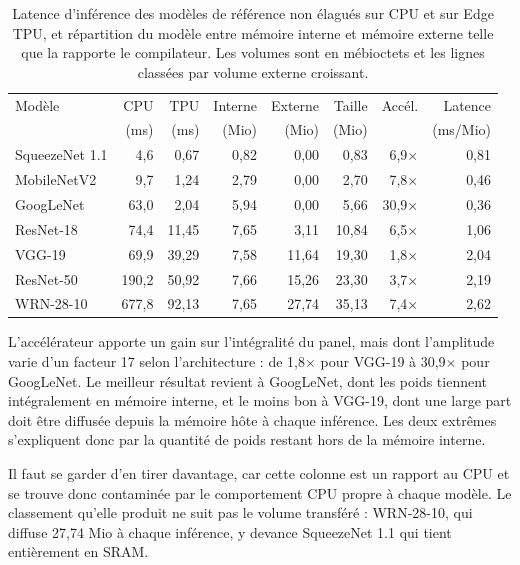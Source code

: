 \documentclass[11pt,a4paper]{report}
\begin{document}
\begin{table}[H]
\centering\footnotesize\setlength{\tabcolsep}{4pt}
\caption[Latence des modèles de référence sur CPU et Edge TPU]{Latence d'inférence des modèles de référence non élagués sur CPU et sur Edge TPU, et répartition du modèle entre mémoire interne et mémoire externe telle que la rapporte le compilateur. Les volumes sont en mébioctets et les lignes classées par volume externe croissant.}
\label{tab:baselines}
\begin{tabular}{lrrrrrrr}
\toprule
Modèle & CPU & TPU & Interne & Externe & Taille & Accél. & Latence \\
       & (ms) & (ms) & (Mio)  & (Mio)   & (Mio)  &        & (ms/Mio) \\
\midrule
SqueezeNet 1.1  &   4,6 &  0,67 & 0,82 &  0,00 &  0,83 &  6,9$\times$ & 0,81 \\
MobileNetV2     &   9,7 &  1,24 & 2,79 &  0,00 &  2,70 &  7,8$\times$ & 0,46 \\
GoogLeNet       &  63,0 &  2,04 & 5,94 &  0,00 &  5,66 & 30,9$\times$ & 0,36 \\
\midrule
ResNet-18       &  74,4 & 11,45 & 7,65 &  3,11 & 10,84 &  6,5$\times$ & 1,06 \\
VGG-19          &  69,9 & 39,29 & 7,58 & 11,64 & 19,30 &  1,8$\times$ & 2,04 \\
ResNet-50       & 190,2 & 50,92 & 7,66 & 15,26 & 23,30 &  3,7$\times$ & 2,19 \\
WRN-28-10       & 677,8 & 92,13 & 7,65 & 27,74 & 35,13 &  7,4$\times$ & 2,62 \\
\bottomrule
\end{tabular}
\end{table}

L'accélérateur apporte un gain sur l'intégralité du panel, mais dont l'amplitude varie d'un facteur 17 selon l'architecture : de 1,8$\times$ pour VGG-19 à 30,9$\times$ pour GoogLeNet. Le meilleur résultat revient à GoogLeNet, dont les poids tiennent intégralement en mémoire interne, et le moins bon à VGG-19, dont une large part doit être diffusée depuis la mémoire hôte à chaque inférence. Les deux extrêmes s'expliquent donc par la quantité de poids restant hors de la mémoire interne.

Il faut se garder d'en tirer davantage, car cette colonne est un rapport au CPU et se trouve donc contaminée par le comportement CPU propre à chaque modèle. Le classement qu'elle produit ne suit pas le volume transféré : WRN-28-10, qui diffuse 27,74 Mio à chaque inférence, y devance SqueezeNet 1.1 qui tient entièrement en SRAM.
\end{document}
